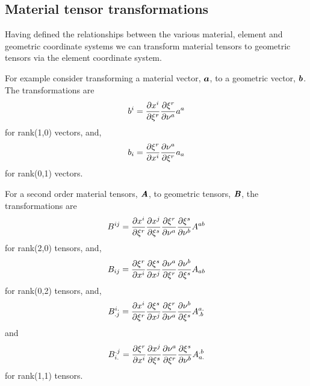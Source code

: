 \subsection{Material tensor transformations}
\label{subsec:MaterialCoordinateTransformationsTensor}

Having defined the relationships between the various material, element
and geometric coordinate systems we can transform material tensors to
geometric tensors via the element coordinate system.

For example consider transforming a material vector, $ \boldsymbol{a} $, to a
geometric vector, $ \boldsymbol{b} $. The transformations are
\begin{equation}
  b^{i}= \dfrac{\partial x^{i}}{\partial \xi^{r}}  \dfrac{\partial \xi^{r}}{\partial \nu^{a}} a^{a}
\end{equation}
for rank(1,0) vectors, and,
\begin{equation}
  b_{i}= \dfrac{\partial \xi^{r}}{\partial x^{i}}  \dfrac{\partial \nu^{a}}{\partial \xi^{r}} a_{a}
\end{equation}
for rank(0,1) vectors.

For a second order material tensors, $\boldsymbol{\mathit{A}}$, to geometric
tensors, $\boldsymbol{\mathit{B}}$, the transformations are
\begin{equation}
  B^{ij}= \dfrac{\partial x^{i}}{\partial \xi^{r}}  \dfrac{\partial x^{j}}{\partial \xi^{s}}  \dfrac{\partial \xi^{r}}{\partial \nu^{a}}  \dfrac{\partial \xi^{s}}{\partial \nu^{b}} A^{ab}
\end{equation}
for rank(2,0) tensors, and,
\begin{equation}
  B_{ij}= \dfrac{\partial \xi^{r}}{\partial x^{i}}  \dfrac{\partial \xi^{s}}{\partial x^{j}}  \dfrac{\partial \nu^{a}}{\partial \xi^{r}}  \dfrac{\partial \nu^{b}}{\partial \xi^{s}} A_{ab}
\end{equation}
for rank(0,2) tensors, and,
\begin{equation}
  B^{i.}_{.j}= \dfrac{\partial x^{i}}{\partial \xi^{r}}  \dfrac{\partial \xi^{s}}{\partial x^{j}}  \dfrac{\partial \xi^{r}}{\partial \nu^{a}}  \dfrac{\partial \nu^{b}}{\partial \xi^{s}} A^{a.}_{.b}
\end{equation}
and
\begin{equation}
  B^{.j}_{i.}= \dfrac{\partial \xi^{r}}{\partial x^{i}}  \dfrac{\partial x^{j}}{\partial \xi^{s}}  \dfrac{\partial \nu^{a}}{\partial \xi^{r}}  \dfrac{\partial \xi^{s}}{\partial \nu^{b}} A^{.b}_{a.}
\end{equation}
for rank(1,1) tensors.

